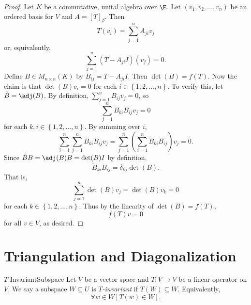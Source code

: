\documentclass[linearalgebraII]{subfiles}
\begin{document}
    \begin{proof}
        Let $K$ be a commutative, unital algebra over $\F$. Let $\left( v_1, v_2, \ldots, v_n \right)$ be an ordered basis for $V$ and $A = \left[ T \right]_\beta$. Then
        \begin{equation*}
            T(v_i) = \sum^{n}_{j=1} A_{ji}v_j
        \end{equation*} 
        or, equivalently,
        \begin{equation*}
            \sum^{n}_{j=1} \left( T - A_{ji}I \right) (v_j) = 0.
        \end{equation*}
        Define $B\in M_{n\times n}(K)$ by $B_{ij} = T - A_{ji}I$. Then $\det(B) = f(T)$. Now the claim is that $\det(B)v_i = 0$ for each $i\in \left\lbrace 1, 2, \ldots, n \right\rbrace$. To verify this, let $\tilde{B} = \adj(B)$. By definition, $\sum^{n}_{j=1} B_{ij}v_j = 0$, so
        \begin{equation*}
            \sum^{n}_{j=1} \tilde{B}_{ki} B_{ij} v_j = 0
        \end{equation*}
        for each $k, i\in \left\lbrace 1, 2, \ldots, n \right\rbrace$. By summing over $i$,
        \begin{equation*}
            \sum^{n}_{i=1} \sum^{n}_{j=1} \tilde{B}_{ki}B_{ij}v_j = \sum^{n}_{j=1} \left( \sum^{n}_{i=1} \tilde{B}_{ki} B_{ij} \right) v_j = 0. 
        \end{equation*}
        Since $\tilde{B}B = \adj(B)B = \det(B)I$ by definition,
        \begin{equation*}
            \tilde{B}_{ki}B_{ij} = \delta_{kj}\det(B).
        \end{equation*}
        That is,
        \begin{equation*}
            \sum^{n}_{j=1} \det(B)v_j = \det(B)v_k = 0
        \end{equation*}
        for each $k\in \left\lbrace 1, 2, \ldots, n \right\rbrace$. Thus by the linearity of $\det(B) = f(T)$,
        \begin{equation*}
            f(T)v = 0
        \end{equation*}
        for all $v\in V$, as desired.
    \end{proof}
    
    \section{Triangulation and Diagonalization}

    \begin{definition}{$T$-Invariant}{Subspace}
        Let $V$ be a vector space and $T:V\to V$ be a linear operator on $V$. We say a subspace $W\subseteq U$ is \emph{$T$-invariant} if $T(W)\subseteq W$. Equivalently,
        \begin{equation*}
            \forall w\in W \left[ T(w)\in W \right].
        \end{equation*}
    \end{definition}
\end{document}
